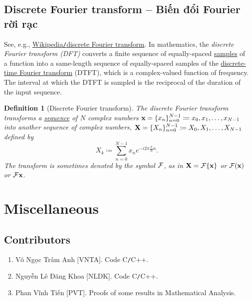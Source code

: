 \documentclass{article}
\newtheorem{definition}{Definition}
\begin{document}

\subsection{Discrete Fourier transform -- Biến đổi Fourier rời rạc}
See, e.g., \href{https://en.wikipedia.org/wiki/Discrete_Fourier_transform}{Wikipedia{\tt/}discrete Fourier transform}. In mathematics, the {\it discrete Fourier transform (DFT)} converts a finite sequence of equally-spaced \href{https://en.wikipedia.org/wiki/Sampling_(signal_processing)}{samples} of a function into a same-length sequence of equally-spaced samples of the \href{https://en.wikipedia.org/wiki/Discrete-time_Fourier_transform}{discrete-time Fourier transform} (DTFT), which is a complex-valued function of frequency. The interval at which the DTFT is sampled is the reciprocal of the duration of the input sequence.

\begin{definition}[Discrete Fourier transform]
	The {\rm discrete Fourier transform} transforms a \href{https://en.wikipedia.org/wiki/Sequence}{sequence} of $N$ complex numbers ${\bf x} = \{x_n\}_{n=0}^{N-1}\coloneqq x_0,x_1,\ldots,x_{N-1}$ into another sequence of complex numbers, ${\bf X} = \{X_n\}_{n=0}^{N-1}\coloneqq X_0,X_1,\ldots,X_{N-1}$ defined by
	\begin{equation}
		\label{discrete Fourier transform}
		\tag{dFt}
		X_k\coloneqq\sum_{n=0}^{N-1} x_ne^{-i2\pi\frac{k}{N}n}.
	\end{equation}
	The transform is sometimes denoted by the symbol ${\cal F}$, as in ${\bf X} = {\cal F}\{{\bf x}\}$ or ${\cal F}({\bf x})$ or ${\cal F}{\bf x}$.
\end{definition}


\section{Miscellaneous}

\subsection{Contributors}

\begin{enumerate}
	\item {\sc Võ Ngọc Trâm Anh [VNTA].} Code C{\tt/}C++.
	\item {\sc Nguyễn Lê Đăng Khoa [NLDK].} Code C{\tt/}C++.
	\item {\sc Phan Vĩnh Tiến [PVT].} Proofs of some results in Mathematical Analysis.
\end{enumerate}
\end{document}
